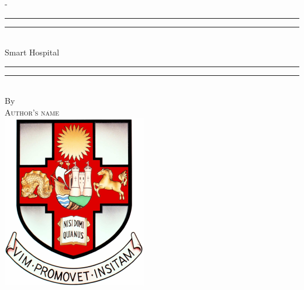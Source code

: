 %
%
% 
%
%
\begin{titlingpage}
\begin{SingleSpace}
\calccentering{\unitlength} 
\begin{adjustwidth*}{\unitlength}{-\unitlength}
\vspace*{13mm}
\begin{center}
\rule[0.5ex]{\linewidth}{2pt}\vspace*{-\baselineskip}\vspace*{3.2pt}
\rule[0.5ex]{\linewidth}{1pt}\\[\baselineskip]
{\HUGE Smart Hospital }\\[4mm]
\rule[0.5ex]{\linewidth}{1pt}\vspace*{-\baselineskip}\vspace{3.2pt}
\rule[0.5ex]{\linewidth}{2pt}\\
\vspace{6.5mm}
{\large By}\\
\vspace{6.5mm}
{\large\textsc{Author's name}}\\
\vspace{11mm}
\includegraphics[scale=0.6]{logos/bristolcrest_colour}\\

\end{center}
\end{adjustwidth*}
\end{SingleSpace}
\end{titlingpage}
